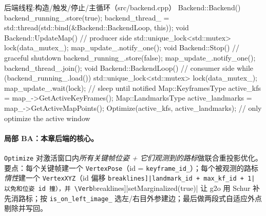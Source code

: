 \begin{codebox}[C++]{后端线程:构造/触发/停止/主循环（src/backend.cpp）}
Backend::Backend() {
    backend_running_.store(true);
    backend_thread_ = std::thread(std::bind(&Backend::BackendLoop, this));
}
void Backend::UpdateMap() {                      // producer side
    std::unique_lock<std::mutex> lock(data_mutex_);
    map_update_.notify_one();
}
void Backend::Stop() {                           // graceful shutdown
    backend_running_.store(false);
    map_update_.notify_one();
    backend_thread_.join();
}
void Backend::BackendLoop() {                    // consumer side
    while (backend_running_.load()) {
        std::unique_lock<std::mutex> lock(data_mutex_);
        map_update_.wait(lock);                  // sleep until notified
        Map::KeyframesType active_kfs       = map_->GetActiveKeyFrames();
        Map::LandmarksType active_landmarks = map_->GetActiveMapPoints();
        Optimize(active_kfs, active_landmarks); // only optimize the active window
    }
}
\end{codebox}

\paragraph{局部 BA：本章后端的核心。}
\texttt{Optimize} 对激活窗口内\emph{所有关键帧位姿 + 它们观测到的路标}做联合重投影优化。要点：每个关键帧建一个 \texttt{VertexPose}（id = \texttt{keyframe\_id\_}）；每个被观测的路标\emph{惰性}建一个 \texttt{VertexXYZ}（id 偏移 \Verb[breaklines]|landmark_id + max_kf_id + 1| 以免和位姿 id 撞），并 \Verb[breaklines]|setMarginalized(true)| 让 g2o 用 Schur 补先消路标；按 \texttt{is\_on\_left\_image\_} 选左/右目外参建边；最后做两段式自适应外点剔除并写回。

